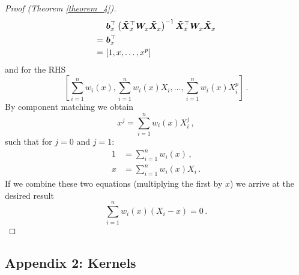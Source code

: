 \begin{proof}[Proof (Theorem \ref{theorem_4})]
	\begin{align}
		&\bm{b}_x^\top \left( \bm{\tilde{X}}_x^\top \bm{W}_x^{\vphantom{\top}} \bm{\tilde{X}}_x^{\vphantom{\top}} \right)^{-1} \bm{\tilde{X}}_x^\top \bm{W}_x^{\vphantom{\top}} \bm{\tilde{X}}_x^{\vphantom{\top}} \\
		= \,\, &\bm{b}_x^\top \\
		= \,\, &[1, x, \dots, x^p]
	\end{align}
	and for the RHS
	\begin{equation}
		\left[ \sum_{i = 1}^{n} w_i(x), \sum_{i = 1}^{n} w_i(x) X_i, \dots, \sum_{i = 1}^{n} w_i(x) X_i^p \right] \,.
	\end{equation}
	By component matching we obtain
	\begin{equation}
		x^j = \sum_{i = 1}^{n} w_i(x) X_i^j \,,
	\end{equation}
	such that for $j = 0$ and $j = 1$:
	\begin{align}
		1 &= \sum_{i = 1}^{n} w_i(x) \,, \\
		x &= \sum_{i = 1}^{n} w_i(x) X_i \,.
	\end{align}
	If we combine these two equations (multiplying the first by $x$) we arrive at the desired result
	\begin{equation}
		\sum_{i = 1}^{n} w_i(x) (X_i - x) = 0 \,.
	\end{equation} 
\end{proof}

\newpage

\subsection*{Appendix 2: Kernels} \label{appendix_2}

